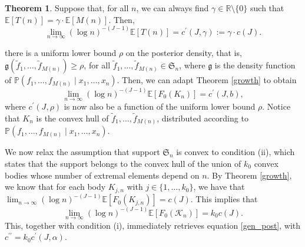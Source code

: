 \documentclass[12pt, reqno]{amsart}
\theoremstyle{definition}
\newtheorem{theorem}{Theorem}%
\begin{document}
\begin{theorem}\label{extrematopost}
Suppose that, for all $n$, 
we can always find $\gamma \in \mathbb{R}\setminus\{0\}$ such that $\mathbb{E}[T(n)]=\gamma \cdot \mathbb{E}[M(n)]$.
Then,
\begin{equation}\label{gen_post}
\lim_{n \rightarrow \infty} (\log n)^{-(J-1)} \mathbb{E}[T(n)] = c^{\prime}(J,\gamma):=\gamma \cdot c(J).
\end{equation}
\end{theorem}





there is a uniform lower bound $\rho$ on the posterior density, that is, $\mathfrak{g}(\tilde{f}_1,\ldots,\tilde{f}_{M(n)}) \geq \rho$, for all $\tilde{f}_1,\ldots,\tilde{f}_{M(n)} \in \mathfrak{S}_n$, where $\mathfrak{g}$ is the density function of  $\mathbb{P}(f_1,\ldots,f_{M(n)} \mid  x_1,\ldots,x_n)$. Then, we can adapt Theorem \ref{growth} to obtain
$$ \lim_{n \rightarrow \infty} (\log n)^{-(J-1)} \mathbb{E}[F_0(K_n)] = c^{\prime}(J,b),$$
where $c^{\prime}(J,\rho)$ is now also be a function of the uniform lower bound $\rho$. Notice that $K_n$ is the convex hull of $\tilde{f}_1,\ldots,\tilde{f}_{M(n)}$, distributed according to $\mathbb{P}(f_1,\ldots,f_{M(n)} \mid  x_1,\ldots,x_n)$.


We now relax the assumption that support $\mathfrak{S}_n$ is convex to condition (ii), which states that the support belongs to the convex hull of the union of $k_0$ convex bodies whose number of extremal elements depend on $n$. By Theorem \ref{growth}, we know that for each body $K_{j,n}$ with $j \in \{1, \dots,k_0\}$, we have that $\lim_{n \rightarrow \infty} (\log n)^{-(J-1)} \mathbb{E}[F_0(K_{j,n})] = c(J)$. This implies that 
$$\lim_{n \rightarrow \infty} (\log n)^{-(J-1)} \mathbb{E} \left[ F_0 \left( \mathscr{K}_n \right) \right] = k_0 c(J).$$
This, together with condition (i), immediately retrieves equation \eqref{gen_post}, with $c^{\prime\prime}=k_0 c^{\prime}(J,\alpha)$.
\fi
\end{document}
